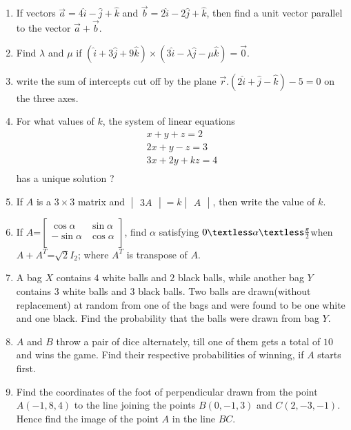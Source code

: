 \documentclass[12pt,-letter paper]{article}
\providecommand{\mydet}[1]{\ensuremath{\begin{vmatrix}#1\end{vmatrix}}}
\providecommand{\myvec}[1]{\ensuremath{\begin{bmatrix}#1\end{bmatrix}}}
\providecommand{\brak}[1]{\ensuremath{\left(#1\right)}}
\begin{document}
\begin{enumerate}
	\item If vectors $\overset{\rightarrow}{a} = 4\hat{i} - \hat{j} + \hat{k}$ and $\overset{\rightarrow}{b} = 2\hat{i} - 2\hat{j} + \hat{k}$, then find a unit vector parallel to the vector $\overset{\rightarrow}{a} + \overset{\rightarrow}{b}$.

	\item Find $\lambda$ and $\mu$ if $\brak{\hat{i} +3\hat{j} + 9\hat{k}} \times \brak{3\hat{i} - \lambda \hat{j} - \mu \hat{k}} =\overset\rightarrow 0$.
  

 \item  write the sum of intercepts cut off by the plane $\overset{\rightarrow}{r}. \brak{2\hat{i}+\hat{j}-\hat{k}}-5=0$ on the three axes.



 \item For what values of $k$, the system of linear equations \begin{align*}
x+y+z=2\\
2x+y-z=3\\
 3x+2y+kz=4\\ \end{align*}
 has a unique solution ?

\item If $A$ is a $3\times3$ matrix and $\mydet{3A}=k\mydet{A}$, then     write the value of $k$.


\item If $A$=$\myvec{\cos\alpha&\sin\alpha\\                           -\sin\alpha&\cos\alpha\\}$, find $\alpha$ satisfying $0\textless\alpha\textless\frac{\pi}{2}$when $A+A^T$=$\sqrt{2}$$I_{2}$; where $A^T$ is     transpose of $A$.

	\item A bag $X$ contains $4$ white balls and $2$ black balls, while another bag $Y$ contains $3$ white balls and $3$ black balls. Two balls are drawn(without replacement) at random from one of the bags and were found to be one white and one black. Find the probability that the balls were drawn from bag $Y$.
	
	\item $A$ and $B$ throw a pair of dice alternately, till one of them gets a total of $10$ and wins the game. Find their respective probabilities of winning, if $A$ starts first.		


	\item Find the coordinates of the foot of perpendicular drawn from the point $A\brak{-1,8,4}$ to the line joining the points $B\brak{0,-1,3}$ and $C\brak{2,-3,-1}$. Hence find the image of the point $A$ in the line $BC$.




\end{enumerate}
\end{document}
